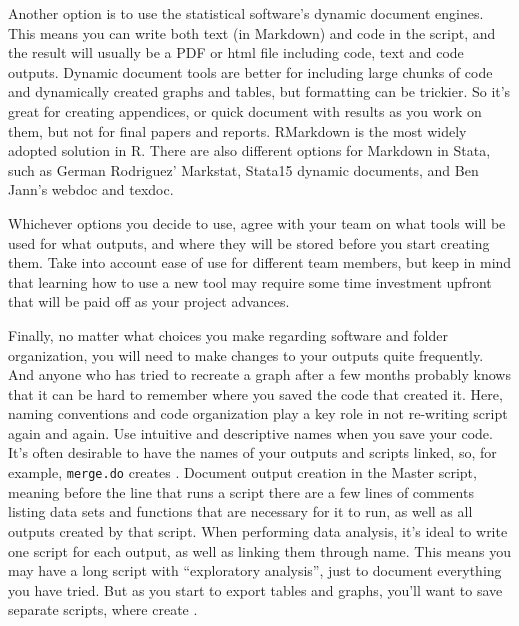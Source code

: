 Another option is to use the statistical software's dynamic document engines. 
This means you can write both text (in Markdown) and code in the script, 
and the result will usually be a PDF or html file including code, 
text and code outputs.  
Dynamic document tools are better for including large chunks of code and dynamically created graphs and tables, 
but formatting can be trickier. 
So it's great for creating appendices, 
or quick document with results as you work on them, 
but not for final papers and reports. 
RMarkdown is the most widely adopted solution in R.
There are also different options for Markdown in Stata,
such as German Rodriguez' Markstat,
Stata15 dynamic documents,
and Ben Jann's webdoc and 
texdoc. 

Whichever options you decide to use, 
agree with your team on what tools will be used for what outputs, and
where they will be stored before you start creating them. 
Take into account ease of use for different team members, but
keep in mind that learning how to use a new tool may require some 
time investment upfront that will be paid off as your project advances.

Finally, no matter what choices you make regarding software and folder organization, 
you will need to make changes to your outputs quite frequently. 
And anyone who has tried to recreate a graph after a few months probably knows 
that it can be hard to remember where you saved the code that created it. 
Here, naming conventions and code organization play a key role in not re-writing script again and again.
Use intuitive and descriptive names when you save your code. 
It's often desirable to have the names of your outputs and scripts linked, 
so, for example, \texttt{merge.do} creates .
Document output creation in the Master script, 
meaning before the line that runs a script there are a few lines of comments listing 
data sets and functions that are necessary for it to run, 
as well as all outputs created by that script. 
When performing data analysis, 
it's ideal to write one script for each output, 
as well as linking them through name. 
This means you may have a long script with ``exploratory analysis'', 
just to document everything you have tried. 
But as you start to export tables and graphs, 
you'll want to save separate scripts, where 
 create . 

